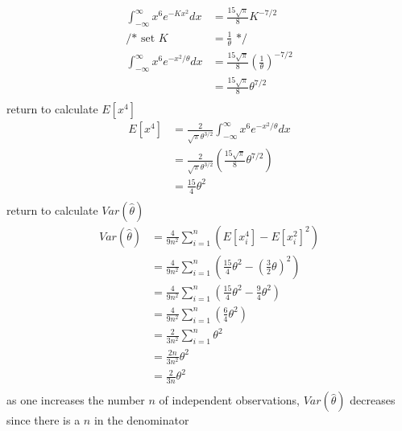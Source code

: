 \documentclass[12pt,border=4pt,multi]{article} %
\begin{document}
\begin{align*}
\int_{-\infty}^{\infty} x^6 e^{-Kx^2} dx &= \frac{15\sqrt{\pi}}{8}K^{-7 / 2}\\
\text{/* set } K &= \frac{1}{\theta} \text{ */}\\
\int_{-\infty}^{\infty} x^6 e^{-x^2 / \theta} dx &= \frac{15\sqrt{\pi}}{8}\left(\frac{1}{\theta}\right)^{-7 / 2}\\
&= \frac{15\sqrt{\pi}}{8}\theta^{7 / 2}\\
\end{align*}
return to calculate $E[x^4]$
\begin{align*}
E[x^4] &= \frac{2}{\sqrt{\pi}\theta^{3 / 2}} \int_{-\infty}^{\infty} x^6 e^{-x^2 / \theta} dx\\
&= \frac{2}{\sqrt{\pi}\theta^{3 / 2}} \left(\frac{15\sqrt{\pi}}{8}\theta^{7 / 2}\right)\\
&= \frac{15}{4}\theta^2\\
\end{align*}
return to calculate $Var(\hat{\theta})$
\begin{align*}
Var(\hat{\theta}) &= \frac{4}{9n^2}\sum_{i = 1}^n \left(E[x_i^4] - E[x_i^2]^2\right)\\
&= \frac{4}{9n^2}\sum_{i = 1}^n \left(\frac{15}{4}\theta^2 - \left(\frac{3}{2}\theta\right)^2\right)\\
&= \frac{4}{9n^2}\sum_{i = 1}^n \left(\frac{15}{4}\theta^2 - \frac{9}{4}\theta^2\right)\\
&= \frac{4}{9n^2}\sum_{i = 1}^n \left(\frac{6}{4}\theta^2\right)\\
&= \frac{2}{3n^2}\sum_{i = 1}^n \theta^2\\
&= \frac{2n}{3n^2}\theta^2\\
&= \frac{2}{3n}\theta^2\\
\end{align*}
as one increases the number $n$ of independent observations, $Var(\hat{\theta})$ decreases since there is a $n$ in the denominator\\
\end{document}
